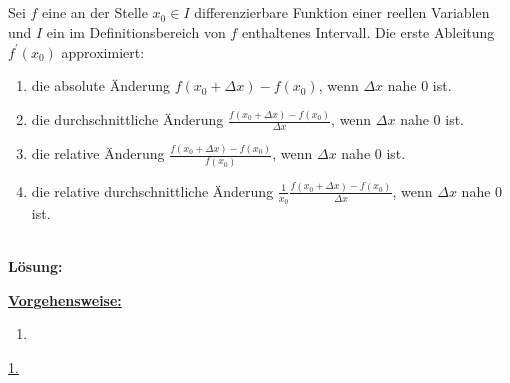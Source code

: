 \newpage

\subsection*{}
Sei $f$ eine an der Stelle $x_0 \in I $ differenzierbare Funktion einer reellen Variablen und $I$ ein im Definitionsbereich von $f$ enthaltenes Intervall. Die erste Ableitung $f^\prime(x_0)$ approximiert: 
\renewcommand{\labelenumi}{(\alph{enumi})}
\begin{enumerate}
	\item 
	die absolute Änderung $f(x_0 + \Delta x) - f(x_0)$, wenn $\Delta x$ nahe $0$ ist.
	\item
	die durchschnittliche Änderung $\frac{f(x_0 + \Delta x) - f(x_0)}{\Delta x}$, wenn $\Delta x$ nahe $0$ ist.
	\item
	die relative Änderung $\frac{f(x_0 + \Delta x) - f(x_0)}{f(x_0)}$, wenn $\Delta x$ nahe $0$ ist.
	\item
	die relative durchschnittliche Änderung $\frac{1}{x_0} \frac{f(x_0 + \Delta x) - f(x_0)}{\Delta x}$, wenn $\Delta x$ nahe $0$ ist.
\end{enumerate}
\ \\
\textbf{Lösung:}
\begin{mdframed}
\underline{\textbf{Vorgehensweise:}}
\renewcommand{\labelenumi}{\theenumi.}
\begin{enumerate}
\item 
\end{enumerate}
\end{mdframed}

\underline{1. }\\



\newpage
